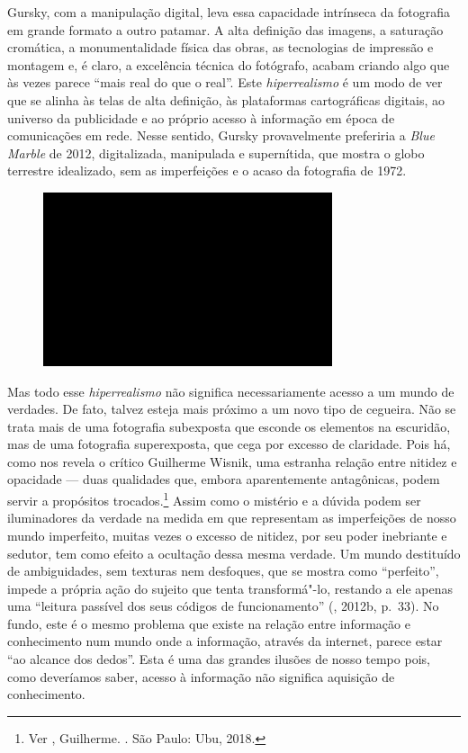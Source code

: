 Gursky, com a manipulação digital, leva essa capacidade intrínseca da
fotografia em grande formato a outro patamar. A alta definição das
imagens, a saturação cromática, a monumentalidade física das obras, as
tecnologias de impressão e montagem e, é claro, a excelência técnica do
fotógrafo, acabam criando algo que às vezes parece ``mais real do que o
real''. Este \emph{hiperrealismo} é um modo de ver que se alinha às
telas de alta definição, às plataformas cartográficas digitais, ao
universo da publicidade e ao próprio acesso à informação em época de
comunicações em rede. Nesse sentido, Gursky provavelmente preferiria a
\emph{Blue Marble} de 2012, digitalizada, manipulada e supernítida, que
mostra o globo terrestre idealizado, sem as imperfeições e o acaso da
fotografia de 1972.

\begin{figure}[!ht]
\centering
 \includegraphics[width=85mm]{./imgs/im1.jpg}
\caption{\tiny{}}
\end{figure}

Mas todo esse \emph{hiperrealismo} não significa necessariamente acesso
a um mundo de verdades. De fato, talvez esteja mais próximo a um novo
tipo de cegueira. Não se trata mais de uma fotografia subexposta que
esconde os elementos na escuridão, mas de uma fotografia superexposta,
que cega por excesso de claridade. Pois há, como nos revela o crítico
Guilherme Wisnik, uma estranha relação entre nitidez e opacidade --- duas
qualidades que, embora aparentemente antagônicas, podem servir a
propósitos trocados.\footnote{Ver , Guilherme. {}. São Paulo:
  Ubu, 2018.} Assim como o mistério e a dúvida podem ser iluminadores da
verdade na medida em que representam as imperfeições de nosso mundo
imperfeito, muitas vezes o excesso de nitidez, por seu poder inebriante
e sedutor, tem como efeito a ocultação dessa mesma verdade. Um mundo
destituído de ambiguidades, sem texturas nem desfoques, que se mostra
como ``perfeito'', impede a própria ação do sujeito que tenta
transformá"-lo, restando a ele apenas uma ``leitura passível dos seus
códigos de funcionamento'' (, 2012b, p.~33). No fundo, este é o
mesmo problema que existe na relação entre informação e conhecimento num
mundo onde a informação, através da internet, parece estar ``ao alcance
dos dedos''. Esta é uma das grandes ilusões de nosso tempo pois, como
deveríamos saber, acesso à informação não significa aquisição de
conhecimento.

